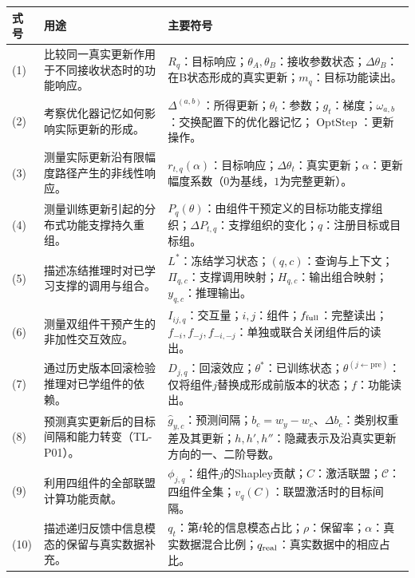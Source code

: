 \endgroup
\newpage
\begin{center}
\begin{minipage}{\textwidth}
\captionsetup{justification=raggedright,singlelinecheck=false,skip=7pt}
\label{tab:equation_guide}
\begingroup
\footnotesize\linespread{1.02}\selectfont
\setlength{\tabcolsep}{3pt}
\renewcommand{\arraystretch}{1.18}
\begin{tabular}{@{}p{}>{\raggedright\arraybackslash}p{}>{\raggedright\arraybackslash}p{}@{}}
\toprule
\textbf{式号} & \textbf{用途} & \textbf{主要符号} \\
\midrule
(1) & 比较同一真实更新作用于不同接收状态时的功能响应。 & $R_q$：目标响应；$\theta_A,\theta_B$：接收参数状态；$\Delta\theta_B$：在B状态形成的真实更新；$m_q$：目标功能读出。\\
\addlinespace[3pt]
(2) & 考察优化器记忆如何影响实际更新的形成。 & $\Delta^{(a,b)}$：所得更新；$\theta_t$：参数；$g_t$：梯度；$\omega_{a,b}$：交换配置下的优化器记忆；$\operatorname{OptStep}$：更新操作。\\
\addlinespace[3pt]
(3) & 测量实际更新沿有限幅度路径产生的非线性响应。 & $r_{t,q}(\alpha)$：目标响应；$\Delta\theta_t$：真实更新；$\alpha$：更新幅度系数（$0$为基线，$1$为完整更新）。\\
\addlinespace[3pt]
(4) & 测量训练更新引起的分布式功能支撑持久重组。 & $P_q(\theta)$：由组件干预定义的目标功能支撑组织；$\Delta P_{t,q}$：支撑组织的变化；$q$：注册目标或目标组。\\
\addlinespace[3pt]
(5) & 描述冻结推理时对已学习支撑的调用与组合。 & $L^*$：冻结学习状态；$(q,c)$：查询与上下文；$\Pi_{q,c}$：支撑调用映射；$H_{q,c}$：输出组合映射；$y_{q,c}$：推理输出。\\
\addlinespace[3pt]
(6) & 测量双组件干预产生的非加性交互效应。 & $I_{ij,q}$：交互量；$i,j$：组件；$f_{\rm full}$：完整读出；$f_{-i},f_{-j},f_{-i,-j}$：单独或联合关闭组件后的读出。\\
\addlinespace[3pt]
(7) & 通过历史版本回滚检验推理对已学组件的依赖。 & $D_{j,q}$：回滚效应；$\theta^*$：已训练状态；$\theta^{(j\leftarrow\mathrm{pre})}$：仅将组件$j$替换成形成前版本的状态；$f$：功能读出。\\
\addlinespace[3pt]
(8) & 预测真实更新后的目标间隔和能力转变（TL-P01）。 & $\widehat g_{y,c}$：预测间隔；$b_c=w_y-w_c$、$\Delta b_c$：类别权重差及其更新；$h,h',h''$：隐藏表示及沿真实更新方向的一、二阶导数。\\
\addlinespace[3pt]
(9) & 利用四组件的全部联盟计算功能贡献。 & $\phi_{j,q}$：组件$j$的Shapley贡献；$C$：激活联盟；$\mathcal C$：四组件全集；$v_q(C)$：联盟激活时的目标间隔。\\
\addlinespace[3pt]
(10) & 描述递归反馈中信息模态的保留与真实数据补充。 & $q_t$：第$t$轮的信息模态占比；$\rho$：保留率；$\alpha$：真实数据混合比例；$q_{\rm real}$：真实数据中的相应占比。\\
\bottomrule
\end{tabular}
\endgroup
\end{minipage}
\end{center}

